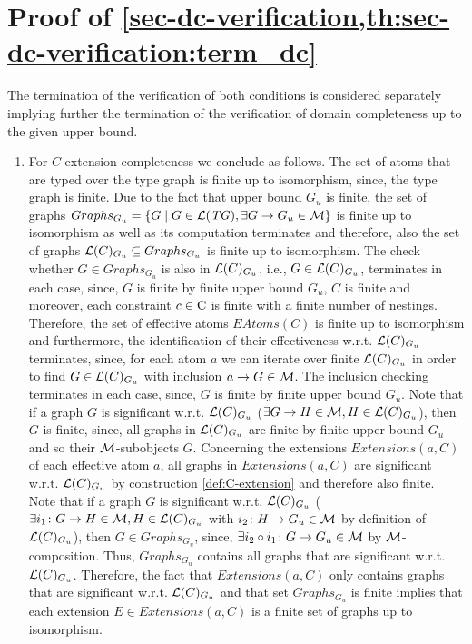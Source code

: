 \section{Proof of \cref{sec-dc-verification,th:sec-dc-verification:term_dc}}
\label{sec-proofs:th:sec-dc-verification:term_dc}
The termination of the verification of both conditions is considered separately implying further the termination of the verification of domain completeness up to the given upper bound.
\begin{enumerate}
  \item For $C$-extension completeness we conclude as follows.
  The set of atoms that are typed over the type graph is finite up to isomorphism, since, the type graph is finite.
  Due to the fact that upper bound $G_u$ is finite, the set of graphs $Graphs_{G_u}=\{G \mid G \in \mathcal{L}(\mathit{TG}),\exists G \to G_u \in {\cal M}\}$ is finite up to isomorphism as well as its computation terminates and therefore, also the set of graphs $\mathcal{L}(C)_{G_u} \subseteq Graphs_{G_u}$ is finite up to isomorphism.
  The check whether $G \in Graphs_{G_u}$ is also in $\mathcal{L}(C)_{G_u}$, i.e., $G \in \mathcal{L}(C)_{G_u}$, terminates in each case, since, $G$ is finite by finite upper bound $G_u$, $C$ is finite and moreover, each constraint $c \in \mathrm{C}$ is finite with a finite number of nestings.
  Therefore, the set of effective atoms $EAtoms(C)$ is finite up to isomorphism and furthermore, the identification of their effectiveness w.r.t. $\mathcal{L}(C)_{G_u}$ terminates, since, for each atom $a$ we can iterate over finite $\mathcal{L}(C)_{G_u}$ in order to find $G \in \mathcal{L}(C)_{G_u}$ with inclusion $a \to G \in {\cal M}$.
  The inclusion checking terminates in each case, since, $G$ is finite by finite upper bound $G_u$.
  Note that if a graph $G$ is significant w.r.t. $\mathcal{L}(C)_{G_u}$ ($\exists G \to H \in {\cal M},H \in \mathcal{L}(C)_{G_u}$), then $G$ is finite, since, all graphs in $\mathcal{L}(C)_{G_u}$ are finite by finite upper bound $G_u$ and so their ${\cal M}$-subobjects $G$.
  Concerning the extensions $Extensions(a,C)$ of each effective atom $a$, all graphs in $Extensions(a,C)$ are significant w.r.t. $\mathcal{L}(C)_{G_u}$ by construction \cref{def:C-extension} and therefore also finite.
  Note that if a graph $G$ is significant w.r.t. $\mathcal{L}(C)_{G_u}$ ($\exists i_1\colon G \to H \in {\cal M},H \in \mathcal{L}(C)_{G_u}$ with $i_2 \colon H \to G_u \in {\cal M}$ by definition of $\mathcal{L}(C)_{G_u}$), then $G \in Graphs_{G_u}$, since, $\exists i_2 \circ i_1\colon G \to G_u \in {\cal M}$ by ${\cal M}$-composition.
  Thus, $Graphs_{G_u}$ contains all graphs that are significant w.r.t. $\mathcal{L}(C)_{G_u}$.
  Therefore, the fact that $Extensions(a,C)$ only contains graphs that are significant w.r.t. $\mathcal{L}(C)_{G_u}$ and that set $Graphs_{G_u}$ is finite implies that each extension $E \in Extensions(a,C)$ is a finite set of graphs up to isomorphism.

\end{enumerate}
